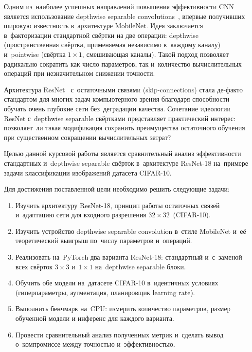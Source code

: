 Одним из~наиболее успешных направлений повышения эффективности CNN является использование depthwise separable convolutions~\cite{mobilenet,xception}, впервые получивших широкую известность в~архитектуре MobileNet. Идея заключается в~факторизации стандартной свёртки на две операции: depthwise (пространственная свёртка, применяемая независимо к~каждому каналу) и~pointwise (свёртка $1\times1$, смешивающая каналы). Такой подход позволяет радикально сократить как число параметров, так и~количество вычислительных операций при незначительном снижении точности.

Архитектура ResNet~\cite{resnet} с~остаточными связями (skip-connections) стала де-факто стандартом для многих задач компьютерного зрения благодаря способности обучать очень глубокие сети без~деградации качества. Сочетание идеологии ResNet с~depthwise separable свёртками представляет практический интерес: позволяет~ли такая модификация сохранить преимущества остаточного обучения при существенном сокращении вычислительных затрат?

Целью данной курсовой работы является сравнительный анализ эффективности стандартных и~depthwise separable свёрток в~архитектуре ResNet-18 на~примере задачи классификации изображений датасета CIFAR-10.

Для достижения поставленной цели необходимо решить следующие задачи:

\begin{enumerate}
    \item Изучить архитектуру ResNet-18, принцип работы остаточных связей и~адаптацию сети для входного разрешения $32\times32$~(CIFAR-10).
    \item Изучить устройство depthwise separable convolution в~стиле MobileNet и~её теоретический выигрыш по~числу параметров и~операций.
    \item Реализовать на~PyTorch два варианта ResNet-18: стандартный и~с~заменой всех свёрток $3\times3$ и~$1\times1$ на~depthwise separable блоки.
    \item Обучить обе модели на~датасете CIFAR-10 в~идентичных условиях (гиперпараметры, аугментация, планировщик learning rate).
    \item Выполнить бенчмарк на~CPU: измерить количество параметров, размер обученной модели и инференс для каждого варианта.
    \item Провести сравнительный анализ полученных метрик и~сделать вывод о~компромиссе между точностью и~эффективностью.
\end{enumerate}

